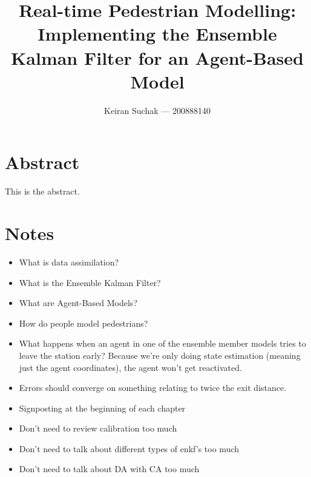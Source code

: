 \documentclass[12pt, twoside, a4paper]{report}
\begin{document}
\title{Real-time Pedestrian Modelling: Implementing the Ensemble Kalman Filter
for an Agent-Based Model}
\author{Keiran Suchak --- 200888140}
\maketitle

\chapter*{\centering Abstract}

This is the abstract.

\tableofcontents
\listoffigures
\listoftables

\chapter*{Notes}

\begin{itemize}
    \item What is data assimilation?
    \item What is the Ensemble Kalman Filter?
    \item What are Agent-Based Models?
    \item How do people model pedestrians?
    \item What happens when an agent in one of the ensemble member models tries
        to leave the station early? Because we're only doing state estimation
        (meaning just the agent coordinates), the agent won't get reactivated.
    \item Errors should converge on something relating to twice the exit
        distance.
    \item Signposting at the beginning of each chapter
    \item Don't need to review calibration too much
    \item Don't need to talk about different types of enkf's too much
    \item Don't need to talk about DA with CA too much
\end{itemize}


\end{document}
